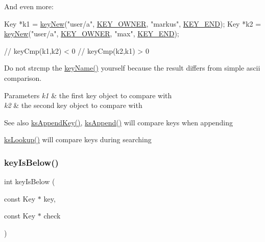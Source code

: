 And even more\+: 
\begin{DoxyCode}
Key *k1 = \hyperlink{group__key_gad23c65b44bf48d773759e1f9a4d43b89}{keyNew}(\textcolor{stringliteral}{"user/a"}, \hyperlink{group__key_gga91fb3178848bd682000958089abbaf40a77ca60362fa8daca8d5347db4385068b}{KEY\_OWNER}, \textcolor{stringliteral}{"markus"}, \hyperlink{group__key_gga91fb3178848bd682000958089abbaf40aa8adb6fcb92dec58fb19410eacfdd403}{KEY\_END});
Key *k2 = \hyperlink{group__key_gad23c65b44bf48d773759e1f9a4d43b89}{keyNew}(\textcolor{stringliteral}{"user/a"}, \hyperlink{group__key_gga91fb3178848bd682000958089abbaf40a77ca60362fa8daca8d5347db4385068b}{KEY\_OWNER}, \textcolor{stringliteral}{"max"}, \hyperlink{group__key_gga91fb3178848bd682000958089abbaf40aa8adb6fcb92dec58fb19410eacfdd403}{KEY\_END});

\textcolor{comment}{// keyCmp(k1,k2) < 0}
\textcolor{comment}{// keyCmp(k2,k1) > 0}
\end{DoxyCode}


Do not strcmp the \hyperlink{group__keyname_ga8e805c726a60da921d3736cda7813513}{key\+Name()} yourself because the result differs from simple ascii comparison.


\begin{DoxyParams}{Parameters}
{\em k1} & the first key object to compare with \\
\hline
{\em k2} & the second key object to compare with\\
\hline
\end{DoxyParams}
\begin{DoxySeeAlso}{See also}
\hyperlink{group__keyset_gaa5a1d467a4d71041edce68ea7748ce45}{ks\+Append\+Key()}, \hyperlink{group__keyset_ga21eb9c3a14a604ee3a8bdc779232e7b7}{ks\+Append()} will compare keys when appending 

\hyperlink{group__keyset_gaa34fc43a081e6b01e4120daa6c112004}{ks\+Lookup()} will compare keys during searching 
\end{DoxySeeAlso}
\mbox{\label{group__keytest_ga03332b5d97c76a4fd2640aca4762b8df}} 
\subsubsection{\texorpdfstring{key\+Is\+Below()}{keyIsBelow()}}
{\footnotesize\ttfamily int key\+Is\+Below (\begin{DoxyParamCaption}\item[{const Key $\ast$}]{key,  }\item[{const Key $\ast$}]{check }\end{DoxyParamCaption})}



